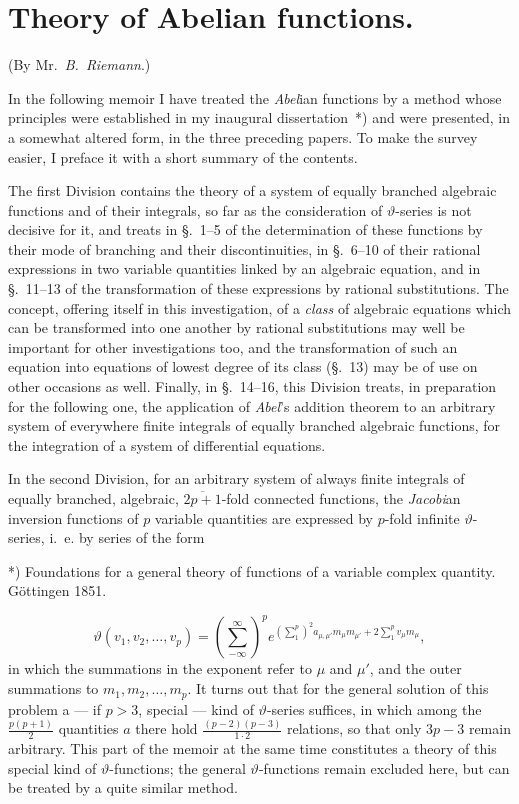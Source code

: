 \documentclass{article}
\begin{document}
\section*{Theory of Abelian functions.}

(By Mr.~\emph{B.~Riemann}.)

In the following memoir I have treated the \emph{Abel}ian functions by a method whose principles were established in my inaugural dissertation~*) and were presented, in a somewhat altered form, in the three preceding papers. To make the survey easier, I preface it with a short summary of the contents.

The first Division contains the theory of a system of equally branched algebraic functions and of their integrals, so far as the consideration of $\vartheta$-series is not decisive for it, and treats in §.~1–5 of the determination of these functions by their mode of branching and their discontinuities, in §.~6–10 of their rational expressions in two variable quantities linked by an algebraic equation, and in §.~11–13 of the transformation of these expressions by rational substitutions. The concept, offering itself in this investigation, of a \emph{class} of algebraic equations which can be transformed into one another by rational substitutions may well be important for other investigations too, and the transformation of such an equation into equations of lowest degree of its class (§.~13) may be of use on other occasions as well. Finally, in §.~14–16, this Division treats, in preparation for the following one, the application of \emph{Abel}'s addition theorem to an arbitrary system of everywhere finite integrals of equally branched algebraic functions, for the integration of a system of differential equations.

In the second Division, for an arbitrary system of always finite integrals of equally branched, algebraic, $\overline{2p+1}$-fold connected functions, the \emph{Jacobi}an inversion functions of $p$ variable quantities are expressed by $p$-fold infinite $\vartheta$-series, i.~e. by series of the form

*) Foundations for a general theory of functions of a variable complex quantity. Göttingen 1851.

\[ \vartheta(v_{1}, v_{2}, \ldots, v_{p}) = \left(\sum_{-\infty}^{\infty}\right)^{p} e^{\left(\sum_{1}^{p}\right)^{2} a_{\mu,\mu'} m_{\mu} m_{\mu'} + 2 \sum_{1}^{p} v_{\mu} m_{\mu}}, \]
in which the summations in the exponent refer to $\mu$ and $\mu'$, and the outer summations to $m_{1}, m_{2}, \ldots, m_{p}$. It turns out that for the general solution of this problem a --- if $p > 3$, special --- kind of $\vartheta$-series suffices, in which among the $\frac{p(p+1)}{2}$ quantities $a$ there hold $\frac{(p-2)(p-3)}{1 \cdot 2}$ relations, so that only $3p-3$ remain arbitrary. This part of the memoir at the same time constitutes a theory of this special kind of $\vartheta$-functions; the general $\vartheta$-functions remain excluded here, but can be treated by a quite similar method.
\end{document}
